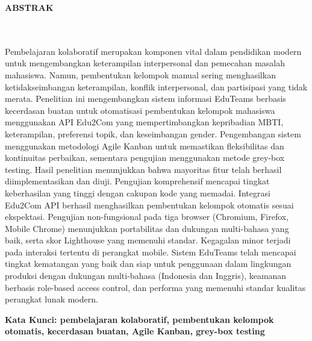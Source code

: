 \clearpage
{}%
\thispagestyle{fancy}

\begin{center}
	\large \bfseries \MakeUppercase{Abstrak}\\
	\normalsize \normalfont {\thetitle}\\
	\normalsize \normalfont {\theauthor}\\
	\bigskip
	
	\normalsize \normalfont \justifying \singlespacing
	Pembelajaran kolaboratif merupakan komponen vital dalam pendidikan modern untuk mengembangkan keterampilan interpersonal dan pemecahan masalah mahasiswa. Namun, pembentukan kelompok manual sering menghasilkan ketidakseimbangan keterampilan, konflik interpersonal, dan partisipasi yang tidak merata. Penelitian ini mengembangkan sistem informasi EduTeams berbasis kecerdasan buatan untuk otomatisasi pembentukan kelompok mahasiswa menggunakan API Edu2Com yang mempertimbangkan kepribadian MBTI, keterampilan, preferensi topik, dan keseimbangan gender. Pengembangan sistem menggunakan metodologi Agile Kanban untuk memastikan fleksibilitas dan kontinuitas perbaikan, sementara pengujian menggunakan metode grey-box testing. Hasil penelitian menunjukkan bahwa mayoritas fitur telah berhasil diimplementasikan dan diuji. Pengujian komprehensif mencapai tingkat keberhasilan yang tinggi dengan cakupan kode yang memadai. Integrasi Edu2Com API berhasil menghasilkan pembentukan kelompok otomatis sesuai ekspektasi. Pengujian non-fungsional pada tiga browser (Chromium, Firefox, Mobile Chrome) menunjukkan portabilitas dan dukungan multi-bahasa yang baik, serta skor Lighthouse yang memenuhi standar. Kegagalan minor terjadi pada interaksi tertentu di perangkat mobile. Sistem EduTeams telah mencapai tingkat kematangan yang baik dan siap untuk penggunaan dalam lingkungan produksi dengan dukungan multi-bahasa (Indonesia dan Inggris), keamanan berbasis role-based access control, dan performa yang memenuhi standar kualitas perangkat lunak modern.\par

    \vspace{20pt}
	\raggedright \textbf{Kata Kunci: pembelajaran kolaboratif, pembentukan kelompok otomatis, kecerdasan buatan, Agile Kanban, grey-box testing}
	
	\vfill
	
\end{center}
\clearpage